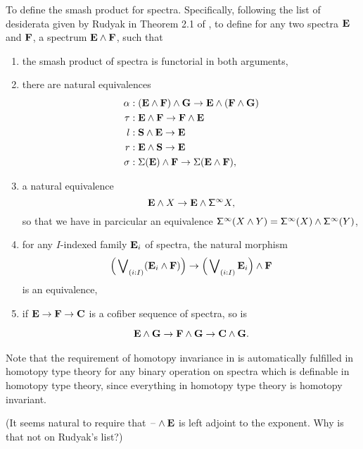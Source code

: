 \documentclass[reqno]{amsart}
\begin{document}
\begin{proposal}\label{p:smash_spectra}
To define the smash product for spectra. Specifically, following the list of
desiderata given by Rudyak in Theorem 2.1 of \cite{Rudyak98}, to define for any two
spectra $\mathbf{E}$ and $\mathbf{F}$, a spectrum $\mathbf{E} \wedge \mathbf{F}$,
such that
\begin{enumerate}
\item the smash product of spectra is functorial in both arguments,
\item there are natural equivalences
\begin{align*}
\alpha & : (\mathbf{E} \wedge \mathbf{F}) \wedge \mathbf{G} \to \mathbf{E} \wedge (\mathbf{F} \wedge \mathbf{G}) \\
\tau & : \mathbf{E} \wedge \mathbf{F}\to\mathbf{F} \wedge \mathbf{E} \\
l & : \mathbf{S} \wedge \mathbf{E}\to\mathbf{E} \\
r & : \mathbf{E} \wedge \mathbf{S}\to\mathbf{E} \\
\sigma & : \Sigma(\mathbf{E}) \wedge \mathbf{F}\to\Sigma(\mathbf{E} \wedge \mathbf{F}),
\end{align*}
\item a natural equivalence
\begin{equation*}
\mathbf{E} \wedge X\to \mathbf{E} \wedge \mathsf{\Sigma}^{\infty}{X},
\end{equation*}
so that we have in parcicular an equivalence $\mathsf{\Sigma}^{\infty}(X \wedge Y)=\mathsf{\Sigma}^{\infty}(X) \wedge \mathsf{\Sigma}^{\infty}(Y)$,
\item for any $I$-indexed family $\mathbf{E}_i$ of spectra, the natural morphism
\begin{equation*}
\Big(\bigvee\nolimits_{(i:I)} (\mathbf{E}_i \wedge \mathbf{F})\Big) \to \Big(\bigvee\nolimits_{(i:I)}\mathbf{E}_i\Big) \wedge \mathbf{F}
\end{equation*}
is an equivalence,
\item if $\mathbf{E}\to\mathbf{F}\to\mathbf{C}$ is a cofiber sequence of spectra, so is
\begin{equation*}
\begin{tikzcd}
\smashpr{\spectrum{E}}{\spectrum{G}}\to\smashpr{\spectrum{F}}{\spectrum{G}} \to \smashpr{\spectrum{C}}{\spectrum{G}}.
\end{tikzcd}
\end{equation*}
\end{enumerate}
Note that the requirement of homotopy invariance in \cite{Rudyak98} is automatically fulfilled in homotopy type theory for any binary operation on spectra which is definable in homotopy type theory, since everything in homotopy type theory is homotopy invariant.

(It seems natural to require that $\mathord{\hspace{1pt}\text{--}\hspace{1pt}} \wedge \mathbf{E}$ is left adjoint to the exponent. Why is that not on Rudyak's list?)
\end{proposal}
\end{document}
